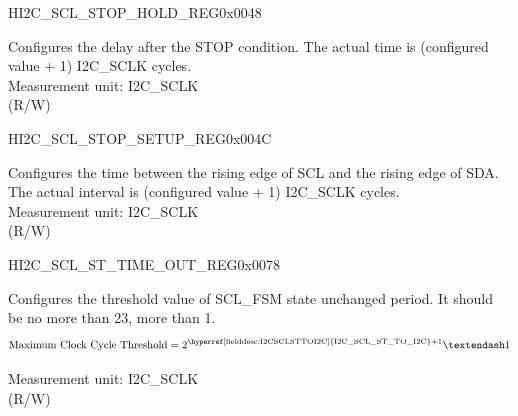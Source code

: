 \begin{register}{H}{I2C\_SCL\_STOP\_HOLD\_REG}{0x0048}\label{regdesc:I2CSCLSTOPHOLDREG}
%
%
\regnewline%
\begin{regdesc}\begin{reglist}
\label{fielddesc:I2CSCLSTOPHOLDTIME}\item [I2C\_SCL\_STOP\_HOLD\_TIME] Configures the delay after the STOP condition. The actual time is (configured value + 1) I2C\_SCLK cycles.\\
Measurement unit: I2C\_SCLK \\ (R/W)
\end{reglist}\end{regdesc}
\end{register}


\begin{register}{H}{I2C\_SCL\_STOP\_SETUP\_REG}{0x004C}\label{regdesc:I2CSCLSTOPSETUPREG}
%
%
\regnewline%
\begin{regdesc}\begin{reglist}
\label{fielddesc:I2CSCLSTOPSETUPTIME}\item [I2C\_SCL\_STOP\_SETUP\_TIME] Configures the time between the rising edge of SCL and the rising edge of SDA. The actual interval is (configured value + 1) I2C\_SCLK cycles.\\
Measurement unit: I2C\_SCLK \\ (R/W)
\end{reglist}\end{regdesc}
\end{register}


\begin{register}{H}{I2C\_SCL\_ST\_TIME\_OUT\_REG}{0x0078}\label{regdesc:I2CSCLSTTIMEOUTREG}
%
%
\regnewline%
\begin{regdesc}\begin{reglist}
\label{fielddesc:I2CSCLSTTOI2C}\item [I2C\_SCL\_ST\_TO\_I2C] Configures the threshold value of SCL\_FSM state unchanged period. It should be no more than 23, more than 1.\\
\[
\text{Maximum Clock Cycle Threshold} = 2^{\text{\hyperref[fielddesc:I2CSCLSTTOI2C]{I2C\_SCL\_ST\_TO\_I2C}} + 1}–1
\]

Measurement unit: I2C\_SCLK \\ (R/W)
\end{reglist}\end{regdesc}
\end{register}



